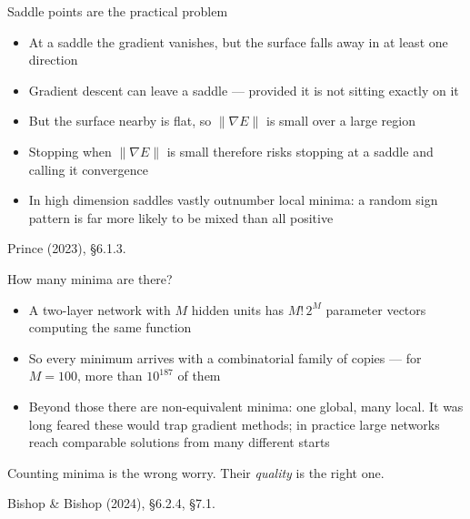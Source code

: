 \documentclass[aspectratio=169, 11pt]{beamer}
\newcommand{\srcline}[1]{%
  \par\vspace{0.25em}%
  {\scriptsize\color{mcMuted}\hfill #1\par}}
\newcommand{\src}[3]{}      %
\begin{document}
\begin{frame}{Saddle points are the practical problem}
  \src{prince2023}{section}{6.1.3}
  \vspace{0.3em}
  \begin{itemize}\itemsep0.45em
    \item At a saddle the gradient vanishes, but the surface falls away
          in at least one direction
    \item Gradient descent can leave a saddle --- provided it is not
          sitting exactly on it
    \item But the surface nearby is \alert{flat}, so
          $\|\nabla E\|$ is small over a large region
    \item Stopping when $\|\nabla E\|$ is small therefore risks stopping
          at a saddle and calling it convergence
    \item In high dimension saddles vastly outnumber local minima: a
          random sign pattern is far more likely to be mixed than all
          positive
  \end{itemize}
  \srcline{Prince (2023), \S6.1.3.}
\end{frame}

\begin{frame}{How many minima are there?}
  \src{bishop2024}{section}{7.1}
  \src{bishop2024}{section}{6.2.4}
  \vspace{0.3em}
  \begin{itemize}\itemsep0.45em
    \item A two-layer network with $M$ hidden units has $M!\,2^M$
          parameter vectors computing the \alert{same} function
    \item So every minimum arrives with a combinatorial family of copies
          --- for $M = 100$, more than $10^{187}$ of them
    \item Beyond those there are \alert{non-equivalent} minima: one
          global, many local. It was long feared these would trap
          gradient methods; in practice large networks reach comparable
          solutions from many different starts
  \end{itemize}
  \begin{redhighlight}
    Counting minima is the wrong worry. Their \emph{quality} is the right
    one.
  \end{redhighlight}
  \srcline{Bishop \& Bishop (2024), \S6.2.4, \S7.1.}
\end{frame}
\end{document}
